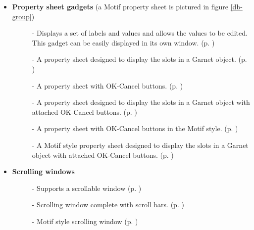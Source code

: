 \begin{itemize}
\item {\bf Property sheet gadgets} (a Motif property sheet is pictured in figure
\ref{db-group})
\begin{description}
\item[]  - Displays a set of labels and values and allows the values
to be edited.  This gadget can be easily displayed in its own window.
(p. \pageref{propertysheets})

\item[]  - A property sheet designed to display the slots
in a Garnet object.  (p. \pageref{propsheetforobj})

\item[]  - A property sheet with OK-Cancel buttons.
(p. \pageref{propsheetwithok})

\item[]  - A property sheet designed to display the
slots in a Garnet object with attached OK-Cancel buttons.
(p. \pageref{propsheetforobjwithok})

\item[]  - A property sheet with OK-Cancel buttons
in the Motif style.  (p. \pageref{motif-prop-sheets})

\item[]  - A Motif style property sheet designed
to display the slots in a Garnet object with attached OK-Cancel buttons.
(p. \pageref{motif-prop-sheet-for-obj-with-ok})
\end{description}

\item \begin{group}
{\bf Scrolling windows}
\begin{description}
\item[]  - Supports a scrollable window
(p. \pageref{scrolling-windows})

\item[]  - Scrolling window complete with scroll bars.
(p. \pageref{scrolling-windows})

\item[]  - Motif style scrolling window
(p. \pageref{motif-scrolling-window})
\end{description}
\end{group}


\end{itemize}
